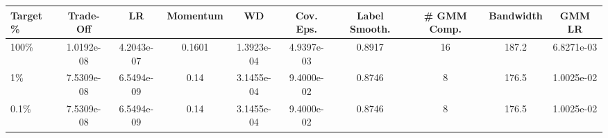\begin{tabular}{l | c c c c c c c c c}
\toprule
Target \% & Trade-Off & LR & Momentum & WD & Cov. Eps. & Label Smooth.  & \# GMM Comp. & Bandwidth & GMM LR \\
\midrule
100\% & 1.0192e-08 & 4.2043e-07 & 0.1601 & 1.3923e-04 & 4.9397e-03 & 0.8917  & 16 & 187.2 & 6.8271e-03 \\
1\% & 7.5309e-08 & 6.5494e-09 & 0.14 & 3.1455e-04 & 9.4000e-02 & 0.8746  & 8 & 176.5 & 1.0025e-02 \\
0.1\% & 7.5309e-08 & 6.5494e-09 & 0.14 & 3.1455e-04 & 9.4000e-02 & 0.8746  & 8 & 176.5 & 1.0025e-02 \\
\bottomrule
\end{tabular}
